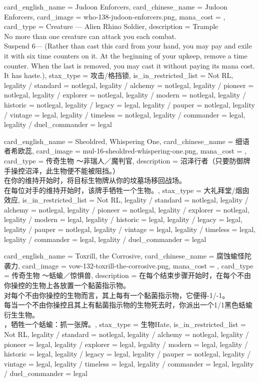 \documentclass[lang = cn, color = black, 10pt]{AllThatStax}
\begin{document}
\card
{
	card_english_name = {Judoon Enforcers},
	card_chinese_name = {Judoon Enforcers},
	card_image = who-138-judoon-enforcers.png,
	mana_cost = ,
	card_type = Creature — Alien Rhino Soldier,
	description = {Trample\\
		No more than one creature can attack you each combat.\\
		Suspend 6— (Rather than cast this card from your hand, you may pay  and exile it with six time counters on it. At the beginning of your upkeep, remove a time counter. When the last is removed, you may cast it without paying its mana cost. It has haste.)},
	stax_type = 攻击/格挡锁,
	is_in_restricted_list = Not RL,
	legality / standard = notlegal,
	legality / alchemy = notlegal,
	legality / pioneer = notlegal,
	legality / explorer = notlegal,
	legality / modern = notlegal,
	legality / historic = notlegal,
	legality / legacy = legal,
	legality / pauper = notlegal,
	legality / vintage = legal,
	legality / timeless = notlegal,
	legality / commander = legal,
	legality / duel_commander = legal
}

\card
{
	card_english_name = {Sheoldred, Whispering One},
	card_chinese_name = {细语者希欧蕊},
	card_image = mul-16-sheoldred-whispering-one.png,
	mana_cost = ,
	card_type = 传奇生物 ～非瑞人／魔判官,
	description = {沼泽行者（只要防御牌手操控沼泽，此生物便不能被阻挡。）\\
		在你的维持开始时，将目标生物牌从你的坟墓场移回战场。\\
		在每位对手的维持开始时，该牌手牺牲一个生物。},
	stax_type = 大礼拜堂/烟囱效应,
	is_in_restricted_list = Not RL,
	legality / standard = notlegal,
	legality / alchemy = notlegal,
	legality / pioneer = notlegal,
	legality / explorer = notlegal,
	legality / modern = legal,
	legality / historic = legal,
	legality / legacy = legal,
	legality / pauper = notlegal,
	legality / vintage = legal,
	legality / timeless = legal,
	legality / commander = legal,
	legality / duel_commander = legal
}

\card
{
	card_english_name = {Toxrill, the Corrosive},
	card_chinese_name = {腐蚀蝓怪陀袭力},
	card_image = vow-132-toxrill-the-corrosive.png,
	mana_cost = ,
	card_type = 传奇生物 ～蛞蝓／惊惧兽,
	description = {在每个结束步骤开始时，在每个不由你操控的生物上各放置一个黏菌指示物。\\
		对每个不由你操控的生物而言，其上每有一个黏菌指示物，它便得-1/-1。\\
		每当一个不由你操控且其上有黏菌指示物的生物死去时，你派出一个1/1黑色蛞蝓衍生生物。\\
		，牺牲一个蛞蝓：抓一张牌。},
	stax_type = 生物Hate,
	is_in_restricted_list = Not RL,
	legality / standard = notlegal,
	legality / alchemy = notlegal,
	legality / pioneer = legal,
	legality / explorer = legal,
	legality / modern = legal,
	legality / historic = legal,
	legality / legacy = legal,
	legality / pauper = notlegal,
	legality / vintage = legal,
	legality / timeless = legal,
	legality / commander = legal,
	legality / duel_commander = legal
}
\end{document}
